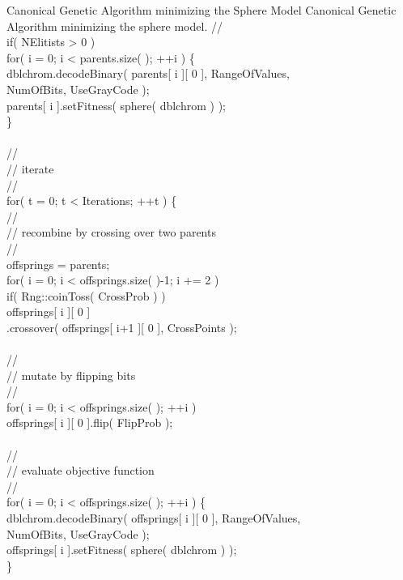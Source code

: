 \begin{programlisting}{Canonical Genetic Algorithm minimizing the Sphere Model}{
    Canonical Genetic Algorithm minimizing the sphere model.}
    //\\
    if( NElitists > 0 )\\
        for( i = 0; i < parents.size( ); ++i ) \{\\
            dblchrom.decodeBinary( parents[ i ][ 0 ], RangeOfValues,\\
                                   NumOfBits, UseGrayCode );\\
            parents[ i ].setFitness( sphere( dblchrom ) );\\
        \}\\
\\
    //\\
    // iterate\\
    //\\
    for( t = 0; t < Iterations; ++t ) \{\\
        //\\
        // recombine by crossing over two parents\\
        //\\
        offsprings = parents;\\
        for( i = 0; i < offsprings.size( )-1; i += 2 )\\
            if( Rng::coinToss( CrossProb ) )\\
                offsprings[ i ][ 0 ]\\
                  .crossover( offsprings[ i+1 ][ 0 ], CrossPoints );\\
\\
        //\\
        // mutate by flipping bits\\
        //\\
        for( i = 0; i < offsprings.size( ); ++i )\\
            offsprings[ i ][ 0 ].flip( FlipProb );\\
\\
        //\\
        // evaluate objective function\\
        //\\
        for( i = 0; i < offsprings.size( ); ++i ) \{\\
            dblchrom.decodeBinary( offsprings[ i ][ 0 ], RangeOfValues,\\
                                   NumOfBits, UseGrayCode );\\
            offsprings[ i ].setFitness( sphere( dblchrom ) );\\
        \}\\

\end{programlisting}
